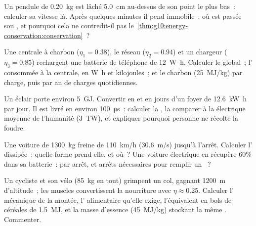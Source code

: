 \begin{exercise}[$\star\star$]\label{exo:g10:energy-conservation:11}
Un pendule de \qty{0.20}{kg} est lâché \qty{5.0}{cm} au-dessus de son
point le plus bas~: calculer sa vitesse là. Après quelques minutes il
pend immobile~: où est passée son , et pourquoi
cela ne contredit-il pas
le~\cref{thm:g10:energy-conservation:conservation}~?
\end{exercise}

\begin{exercise}[$\star\star\star$]\label{exo:g10:energy-conservation:12}
Une centrale à charbon ($\eta_1 = 0.38$), le réseau
($\eta_2 = 0.94$) et un chargeur ($\eta_3 = 0.85$) rechargent une
batterie de téléphone de \qty{12}{W.h}. Calculer le
 global~; l' consommée à la centrale, en \unit{W.h} et kilojoules~; et le
charbon (\qty{25}{MJ/kg}) par charge, puis par an de charges
quotidiennes.
\end{exercise}

\begin{exercise}[$\star\star\star$]\label{exo:g10:energy-conservation:13}
Un éclair porte environ \qty{5}{GJ}. Convertir en
 et en jours d'un foyer de
\qty{12.6}{kW.h} par jour. Il est livré en environ
\qty{100}{\micro s}~: calculer la , la
comparer à la  électrique moyenne de
l'humanité (\qty{3}{TW}), et expliquer pourquoi personne ne récolte la
foudre.
\end{exercise}

\begin{exercise}[$\star\star\star$]\label{exo:g10:energy-conservation:14}
Une voiture de \qty{1300}{kg} freine de \qty{110}{km/h}
(\qty{30.6}{m/s}) jusqu'à l'arrêt. Calculer l' dissipée~; quelle forme prend-elle, et où~? Une voiture
électrique en récupère $60\%$ dans sa batterie~:
 par arrêt, et arrêts nécessaires pour
remplir un ~?
\end{exercise}

\begin{exercise}[$\star\star\star$]\label{exo:g10:energy-conservation:15}
Un cycliste et son vélo (\qty{85}{kg} en tout) grimpent un col,
gagnant \qty{1200}{m} d'altitude~; les muscles convertissent la
nourriture avec $\eta \approx 0.25$. Calculer l'
mécanique de la montée, l' alimentaire qu'elle
exige, l'équivalent en bols de céréales de \qty{1.5}{MJ}, et la masse
d'essence (\qty{45}{MJ/kg}) stockant la même
. Commenter.
\end{exercise}

